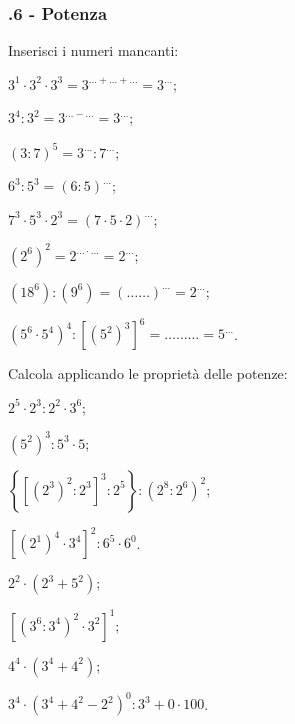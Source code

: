 \subsubsection*{\thechapter.6 - Potenza}
\begin{esercizio}
\label{ese:1.10}
Inserisci i numeri mancanti:
 \begin{multicols}{2}
 \begin{enumeratea}
 \item $3^1\cdot3^2\cdot3^3=3^{\ldots+\ldots+\ldots}=3^{\ldots}$;
 \item $3^4:3^2=3^{\ldots-\ldots}=3^{\ldots}$;
 \item $(3:7)^5=3^{\ldots}:7^{\ldots}$;
 \item $6^3:5^3=(6:5)^{\ldots}$;
 \item $7^3\cdot5^3\cdot2^3=(7\cdot 5 \cdot 2)^{\ldots}$;
 \item $\left(2^6\right)^2=2^{\ldots\cdot\ldots}=2^{\ldots}$;
 \item $\left(18^6\right):\left(9^6\right)=(\ldots\ldots)^{\ldots}=2^{\ldots}$;
 \item $\left(5^6\cdot5^4\right)^4:\left[\left(5^2\right)^3\right]^6=\ldots\ldots\ldots=5^{\ldots}$.
 \end{enumeratea}

 \end{multicols}
\end{esercizio}

\begin{esercizio}[\Ast]
\label{ese:1.11}
Calcola applicando le proprietà delle potenze:
 \begin{multicols}{2}
 \begin{enumeratea}
 \item $2^5\cdot2^3:2^2\cdot3^6$;
 \item $\left(5^2\right)^3:5^3\cdot5$;
 \item $\left\{\left[\left(2^3\right)^2:2^3\right]^3:2^5\right\}:\left(2^8:2^6\right)^2$;
 \item $\left[\left(2^1\right)^4\cdot 3^4\right]^2:6^5\cdot6^0$.
 \item $2^2\cdot\left(2^3+5^2\right)$;
 \item $\left[\left(3^6:3^4\right)^2\cdot3^2\right]^1$;
 \item $4^4\cdot\left(3^4+4^2\right)$;
 \item $3^4\cdot\left(3^4+4^2-2^2\right)^0:3^3+0\cdot 100$.
 \end{enumeratea}
 \end{multicols}
\end{esercizio}

